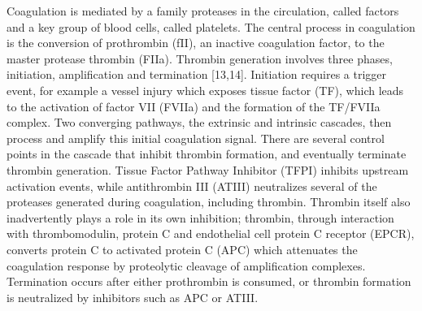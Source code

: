 \documentclass[12pt]{article}
\begin{document}
Coagulation is mediated by a family proteases in the circulation, called factors and a key group of blood cells, called platelets.
The central process in coagulation is the conversion of prothrombin (fII), an inactive coagulation factor, to the master protease thrombin (FIIa).
Thrombin generation involves three phases, initiation, amplification and termination [13,14].
Initiation requires a trigger event, for example a vessel injury which exposes tissue factor (TF), which leads to the activation of factor VII (FVIIa) and the formation of the TF/FVIIa complex.
Two converging pathways, the extrinsic and intrinsic cascades, then process and amplify this initial coagulation signal.
There are several control points in the cascade that inhibit thrombin formation, and eventually terminate thrombin generation.
Tissue Factor Pathway Inhibitor (TFPI) inhibits upstream activation events, while antithrombin III (ATIII) neutralizes several of the proteases generated during coagulation, including thrombin.
Thrombin itself also inadvertently plays a role in its own inhibition; thrombin, through interaction with thrombomodulin, protein C and endothelial cell protein C receptor (EPCR), converts protein C to activated protein C (APC) which attenuates the coagulation response by proteolytic cleavage of amplification complexes.
Termination occurs after either prothrombin is consumed, or thrombin formation is neutralized by inhibitors such as APC or ATIII.

\end{document}

